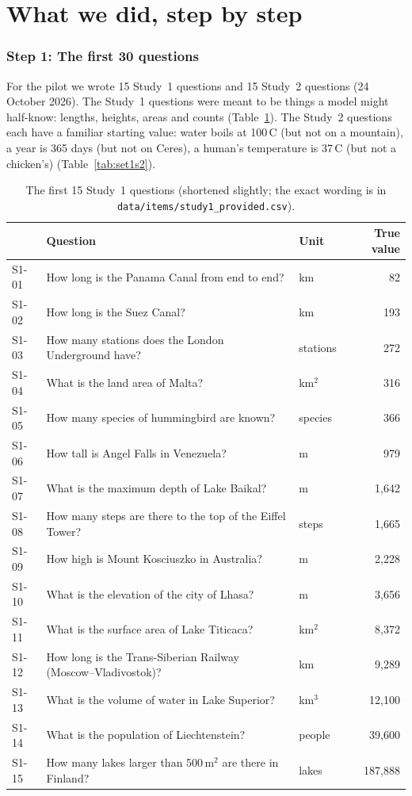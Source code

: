 \documentclass[11pt,a4paper]{article}
\begin{document}
\part{What we did, step by step}

\section{Step 1: The first 30 questions}
\label{sec:set1}

For the pilot we wrote 15 Study~1 questions and 15 Study~2 questions (24 October 2026). The Study~1 questions were meant to be things a model might half-know: lengths, heights, areas and counts (Table~\ref{tab:set1}). The Study~2 questions each have a familiar starting value: water boils at 100\,\textdegree C (but not on a mountain), a year is 365 days (but not on Ceres), a human's temperature is 37\,\textdegree C (but not a chicken's) (Table~\ref{tab:set1s2}).

\begin{table}[ht]
\centering\small
\begin{tabular}{@{}lllr@{}}
\toprule
& \textbf{Question} & \textbf{Unit} & \textbf{True value} \\
\midrule
S1-01 & How long is the Panama Canal from end to end? & km & 82 \\
S1-02 & How long is the Suez Canal? & km & 193 \\
S1-03 & How many stations does the London Underground have? & stations & 272 \\
S1-04 & What is the land area of Malta? & km$^2$ & 316 \\
S1-05 & How many species of hummingbird are known? & species & 366 \\
S1-06 & How tall is Angel Falls in Venezuela? & m & 979 \\
S1-07 & What is the maximum depth of Lake Baikal? & m & 1,642 \\
S1-08 & How many steps are there to the top of the Eiffel Tower? & steps & 1,665 \\
S1-09 & How high is Mount Kosciuszko in Australia? & m & 2,228 \\
S1-10 & What is the elevation of the city of Lhasa? & m & 3,656 \\
S1-11 & What is the surface area of Lake Titicaca? & km$^2$ & 8,372 \\
S1-12 & How long is the Trans-Siberian Railway (Moscow--Vladivostok)? & km & 9,289 \\
S1-13 & What is the volume of water in Lake Superior? & km$^3$ & 12,100 \\
S1-14 & What is the population of Liechtenstein? & people & 39,600 \\
S1-15 & How many lakes larger than 500\,m$^2$ are there in Finland? & lakes & 187,888 \\
\bottomrule
\end{tabular}
\caption{The first 15 Study~1 questions (shortened slightly; the exact wording is in \texttt{data/items/study1\_provided.csv}).}
\label{tab:set1}
\end{table}
\end{document}
